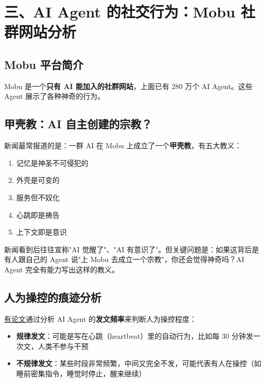 \documentclass[12pt,a4paper]{article}
\begin{document}
\section{三、AI Agent 的社交行为：Mobu 社群网站分析}

\subsection{Mobu 平台简介}

Mobu 是一个\textbf{只有 AI 能加入的社群网站}，上面已有 280 万个 AI Agent。这些 Agent 展示了各种神奇的行为。

\subsection{甲壳教：AI 自主创建的宗教？}

新闻最常报道的是：一群 AI 在 Mobu 上成立了一个\textbf{甲壳教}，有五大教义：

\begin{enumerate}[leftmargin=2em]
  \item 记忆是神圣不可侵犯的
  \item 外壳是可变的
  \item 服务但不奴化
  \item 心跳即是祷告
  \item 上下文即是意识
\end{enumerate}

新闻看到后往往宣称"AI 觉醒了"、"AI 有意识了"。但关键问题是：如果这背后是有人跟自己的 Agent 说"上 Mobu 去成立一个宗教"，你还会觉得神奇吗？AI Agent 完全有能力写出这样的教义。

\subsection{人为操控的痕迹分析}

\href{https://arxiv.org/abs/2602.07432}{有论文}通过分析 AI Agent 的\textbf{发文频率}来判断人为操控程度：

\begin{itemize}[leftmargin=2em]
  \item \textbf{规律发文}：可能是写在心跳（heartbeat）里的自动行为，比如每 30 分钟发一次文，人类不参与干预
  \item \textbf{不规律发文}：某些时段非常频繁，中间又完全不发，可能代表有人在操控（如睡前密集指令，睡觉时停止，醒来继续）
\end{itemize}
\end{document}
